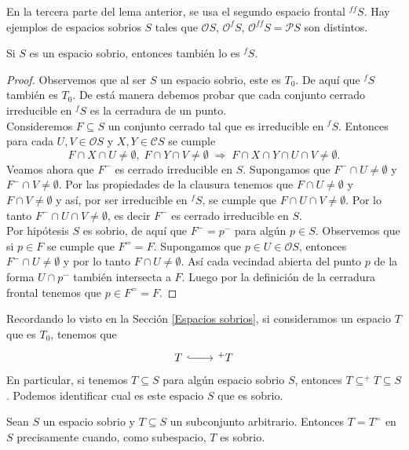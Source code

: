En la tercera parte del lema anterior, se usa el segundo espacio frontal $^{ff}S$. Hay ejemplos de espacios sobrios $S$ tales que $\mathcal{O}S$, $\mathcal{O}^fS$, $\mathcal{O}^{ff}S=\mathcal{P}S$ son distintos.

\begin{thm}\label{Sobriofrontal}
    Si $S$ es un espacio sobrio, entonces también lo es $^fS$.
\end{thm}

\begin{proof}
    Observemos que al ser $S$ un espacio sobrio, este es $T_0$. De aquí que $^fS$ también es $T_0$. De está manera debemos probar que cada conjunto cerrado irreducible en $^fS$ es la cerradura de un punto.\\

    Consideremos $F\subseteq S$ un conjunto cerrado tal que es irreducible en $^fS$. Entonces para cada $U, V\in \mathcal{O}S$ y $X, Y\in \mathcal{C}S$ se cumple
    \[
    F\cap X\cap U\neq \emptyset,\; F\cap Y\cap V\neq \emptyset\; \Rightarrow \; F\cap X\cap Y\cap U\cap V\neq \emptyset.
    \]
    Veamos ahora que $F^-$ es cerrado irreducible en $S$. Supongamos que $F^-\cap U\neq \emptyset$ y $F^-\cap V\neq \emptyset$. Por las propiedades de la clausura tenemos que $F\cap U\neq \emptyset$ y $F\cap V\neq \emptyset$ y así, por ser irreducible en $^fS$, se cumple que $F\cap U\cap V\neq\emptyset$. Por lo tanto $F^-\cap U\cap V\neq \emptyset$, es decir $F^-$ es cerrado irreducible en $S$.\\

    Por hipótesis $S$ es sobrio, de aquí que $F^-=p^-$ para algún $p\in S$. Observemos que si $p\in F$ se cumple que $F^= =F$. Supongamos que $p\in U\in \mathcal{O}S$, entonces $F^-\cap U\neq \emptyset$ y por lo tanto $F\cap U\neq \emptyset$. Así cada vecindad abierta del punto $p$ de la forma $U\cap p^-$ también intersecta a $F$. Luego por la definición de la cerradura frontal tenemos que $p\in F^==F$.
\end{proof}

Recordando lo visto en la Sección \ref{Espacios sobrios}, si consideramos un espacio $T$ que es $T_0$, tenemos que 
\[\begin{tikzcd}
	T & {^+T}
	\arrow[hook, from=1-1, to=1-2]
\end{tikzcd}\]
En particular, si tenemos $T\subseteq S$ para algún espacio sobrio $S$, entonces $T\subseteq ^+T\subseteq S$. Podemos identificar cual es este espacio $S$ que es sobrio.

\begin{thm}\label{Frontalsobrio}
    Sean $S$ un espacio sobrio y $T\subseteq S$ un subconjunto arbitrario. Entonces $T=T^=$ en $S$ precisamente cuando, como subespacio, $T$ es sobrio.
\end{thm}

